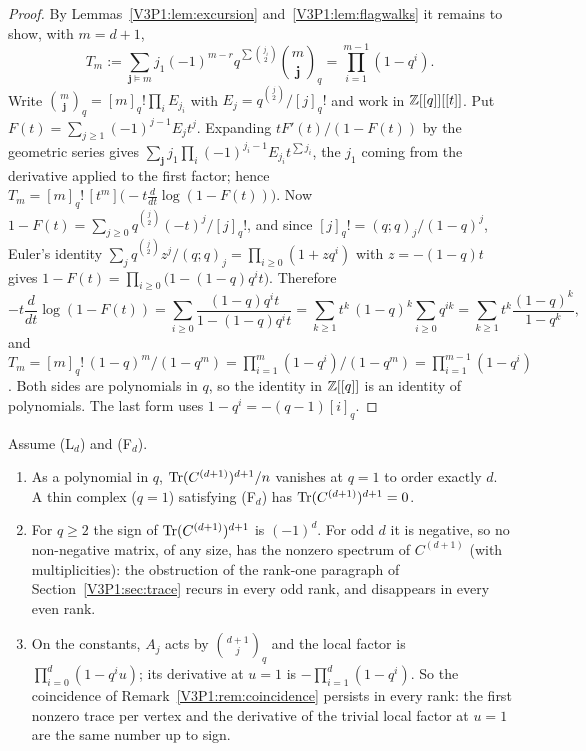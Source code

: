 \begin{proof}
By Lemmas~\ref{V3P1:lem:excursion} and~\ref{V3P1:lem:flagwalks} it remains to show, with $m=d+1$,
\[
T_m:=\sum_{\mathbf j\models m}j_1(-1)^{m-r}q^{\sum\binom{j_i}2}\binom{m}{\mathbf j}_q=\prod_{i=1}^{m-1}(1-q^{i}).
\]
Write $\binom{m}{\mathbf j}_q=[m]_q!\prod_iE_{j_i}$ with $E_j=q^{\binom j2}/[j]_q!$ and work in
$\mathbb{Z}[[q]][[t]]$. Put $F(t)=\sum_{j\ge1}(-1)^{j-1}E_jt^{j}$. Expanding $tF'(t)/(1-F(t))$ by the geometric
series gives $\sum_{\mathbf j}j_1\prod_i(-1)^{j_i-1}E_{j_i}t^{\sum j_i}$, the $j_1$ coming from the
derivative applied to the first factor; hence $T_m=[m]_q!\,[t^{m}]\bigl(-t\tfrac{d}{dt}\log(1-F(t))\bigr)$.
Now $1-F(t)=\sum_{j\ge0}q^{\binom j2}(-t)^{j}/[j]_q!$, and since $[j]_q!=(q;q)_j/(1-q)^{j}$, Euler's
identity $\sum_jq^{\binom j2}z^{j}/(q;q)_j=\prod_{i\ge0}(1+zq^{i})$ with $z=-(1-q)t$ gives
$1-F(t)=\prod_{i\ge0}\bigl(1-(1-q)q^{i}t\bigr)$. Therefore
\[
-t\frac{d}{dt}\log(1-F(t))=\sum_{i\ge0}\frac{(1-q)q^{i}t}{1-(1-q)q^{i}t}
=\sum_{k\ge1}t^{k}\,(1-q)^{k}\sum_{i\ge0}q^{ik}=\sum_{k\ge1}t^{k}\frac{(1-q)^{k}}{1-q^{k}},
\]
and $T_m=[m]_q!\,(1-q)^{m}/(1-q^{m})=\prod_{i=1}^{m}(1-q^{i})/(1-q^{m})=\prod_{i=1}^{m-1}(1-q^{i})$.
Both sides are polynomials in $q$, so the identity in $\mathbb{Z}[[q]]$ is an identity of polynomials. The
last form uses $1-q^{i}=-(q-1)[i]_q$.
\end{proof}

\begin{corollary}\label{V3P1:cor:tracead}
Assume \textup{(L$_d$)} and \textup{(F$_d$)}.
\begin{enumerate}
\item[(i)] As a polynomial in $q$, $\operatorname{Tr}(C^{(d+1)})^{d+1}/n$ vanishes at $q=1$ to order exactly $d$. A
thin complex ($q=1$) satisfying \textup{(F$_d$)} has $\operatorname{Tr}(C^{(d+1)})^{d+1}=0$.
\item[(ii)] For $q\ge2$ the sign of $\operatorname{Tr}(C^{(d+1)})^{d+1}$ is $(-1)^{d}$. For odd $d$ it is negative, so
no non-negative matrix, of any size, has the nonzero spectrum of $C^{(d+1)}$ (with multiplicities):
the obstruction of the rank-one paragraph of Section~\ref{V3P1:sec:trace} recurs in every odd rank,
and disappears in every even rank.
\item[(iii)] On the constants, $A_j$ acts by $\binom{d+1}j_q$ and the local factor is
$\prod_{i=0}^{d}(1-q^{i}u)$; its derivative at $u=1$ is $-\prod_{i=1}^{d}(1-q^{i})$. So the coincidence
of Remark~\ref{V3P1:rem:coincidence} persists in every rank: the first nonzero trace per vertex and the
derivative of the trivial local factor at $u=1$ are the same number up to sign.
\end{enumerate}
\end{corollary}

